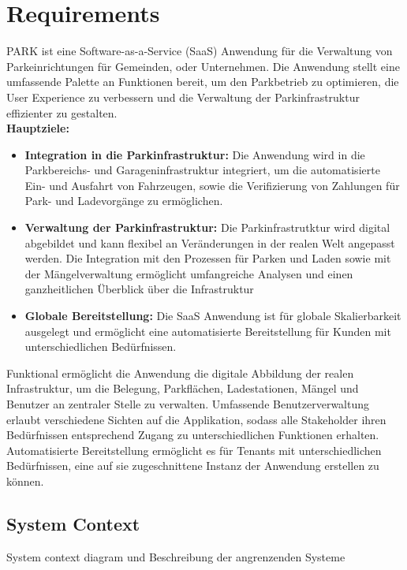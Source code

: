 \section{Requirements}

PARK ist eine Software-as-a-Service (SaaS) Anwendung für die Verwaltung von Parkeinrichtungen für Gemeinden, oder Unternehmen.
Die Anwendung stellt eine umfassende Palette an Funktionen bereit, um den Parkbetrieb zu optimieren, 
die User Experience zu verbessern und die Verwaltung der Parkinfrastruktur effizienter zu gestalten.  \\


\textbf{Hauptziele:}

\begin{itemize}
    \item \textbf{Integration in die Parkinfrastruktur:} Die Anwendung wird in die Parkbereichs- und Garageninfrastruktur integriert, um die automatisierte Ein- und Ausfahrt von Fahrzeugen, sowie die Verifizierung von Zahlungen für Park- und Ladevorgänge zu ermöglichen.
    \item \textbf{Verwaltung der Parkinfrastruktur:} Die Parkinfrastrutktur wird digital abgebildet und kann flexibel an Veränderungen in der realen Welt angepasst werden. Die Integration mit den Prozessen für Parken und Laden sowie mit der Mängelverwaltung ermöglicht umfangreiche Analysen und einen ganzheitlichen Überblick über die Infrastruktur
    \item \textbf{Globale Bereitstellung:} Die SaaS Anwendung ist für globale Skalierbarkeit ausgelegt und ermöglicht eine automatisierte Bereitstellung für Kunden mit unterschiedlichen Bedürfnissen.
\end{itemize}


Funktional ermöglicht die Anwendung die digitale Abbildung der realen Infrastruktur, um die Belegung, Parkflächen, Ladestationen, Mängel und Benutzer an zentraler Stelle zu verwalten. Umfassende Benutzerverwaltung erlaubt verschiedene Sichten auf die Applikation, sodass alle Stakeholder ihren Bedürfnissen entsprechend Zugang zu unterschiedlichen Funktionen erhalten. Automatisierte Bereitstellung ermöglicht es für Tenants mit unterschiedlichen Bedürfnissen, eine auf sie zugeschnittene Instanz der Anwendung erstellen zu können.


\subsection{System Context}
System context diagram und Beschreibung der angrenzenden Systeme


